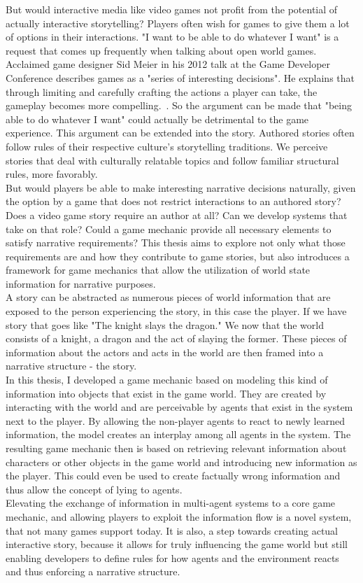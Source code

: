 But would interactive media like video games not profit from the potential of actually interactive storytelling? Players often wish for games to give them a lot of options in their interactions. "I want to be able to do whatever I want" is a request that comes up frequently when talking about open world games. Acclaimed game designer Sid Meier in his 2012 talk at the Game Developer Conference describes games as a "series of interesting decisions". He explains that through limiting and carefully crafting the actions a player can take, the gameplay becomes more compelling.~\cite{Dring2018}. So the argument can be made that "being able to do whatever I want" could actually be detrimental to the game experience. This argument can be extended into the story. Authored stories often follow rules of their respective culture's storytelling traditions. We perceive stories that deal with culturally relatable topics and follow familiar structural rules, more favorably.~\cite{Cooney2017}\\
But would players be able to make interesting narrative decisions naturally, given the option by a game that does not restrict interactions to an authored story? Does a video game story require an author at all? Can we  develop systems that take on that role? Could a game mechanic provide all necessary elements to satisfy narrative requirements? This thesis aims to explore not only what those requirements are and how they contribute to game stories, but also introduces a framework for game mechanics that allow the utilization of world state information for narrative purposes.\\
A story can be abstracted as numerous pieces of world information that are exposed to the person experiencing the story, in this case the player. If we have story that goes like "The knight slays the dragon." We now that the world consists of a knight, a dragon and the act of slaying the former. These pieces of information about the actors and acts in the world are then framed into a narrative structure - the story.\\ %
In this thesis, I developed a game mechanic based on modeling this kind of information into objects that exist in the game world. They are created by interacting with the world and are perceivable by agents that exist in the system next to the player. By allowing the non-player agents to react to newly learned information, the model creates an interplay among all agents in the system. The resulting game mechanic then is based on retrieving relevant information about characters or other objects in the game world and introducing new information as the player. This could even be used to create factually wrong information and thus allow the concept of lying to agents.\\
Elevating the exchange of information in multi-agent systems to a core game mechanic, and allowing players to exploit the information flow is a novel system, that not many games support today. It is also, a step towards creating actual interactive story, because it allows for truly influencing the game world but still enabling developers to define rules for how agents and the environment reacts and thus enforcing a narrative structure.